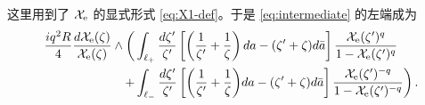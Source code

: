 这里用到了 $\mathcal{X}_{\mathrm{e}}$ 的显式形式 \eqref{eq:X1-def}。于是 \eqref{eq:intermediate} 的左端成为
\begin{equation} \label{eq:intermediate-2}
\begin{split}
\frac{i q^2 R}{4} \frac{d \mathcal{X}_{\mathrm{e}}(\zeta)}{\mathcal{X}_{\mathrm{e}}(\zeta)} \wedge
\biggl( & \int_{\ell_+}  \frac{d \zeta'}{\zeta'}  \left[\left(\frac{1}{\zeta'}+\frac{1}{\zeta}\right)da - ( \zeta'+\zeta)d\bar a\right]\frac{\mathcal{X}_{\mathrm{e}}(\zeta')^{q}}{1-\mathcal{X}_{\mathrm{e}}(\zeta')^{q}}  \\
+ & \int_{\ell_-}  \frac{d \zeta'}{\zeta'}  \left[\left(\frac{1}{\zeta'}+\frac{1}{\zeta}\biggr)da - ( \zeta'+\zeta)d\bar a\right]\frac{\mathcal{X}_{\mathrm{e}}(\zeta')^{-q}}{1-\mathcal{X}_{\mathrm{e}}(\zeta')^{-q}}
\right).
\end{split}
\end{equation}

